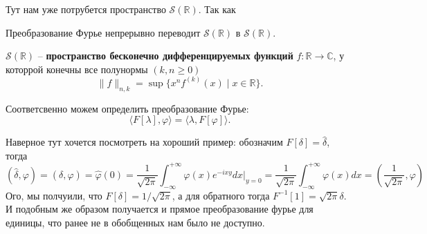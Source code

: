 Тут нам уже потрубется пространство $\mathcal{S}(\mathbb{R})$. Так как
\begin{to_def}
	Преобразование Фурье непрерывно переводит $\mathcal{S}(\mathbb{R})$ в $\mathcal{S}(\mathbb{R})$.
\end{to_def}

\begin{to_def}
	$\mathcal{S}(\mathbb{R})$ -- \textbf{пространство бесконечно дифференцируемых функций} $f \colon \mathbb{R} \to \mathbb{C}$, у которрой конечны все полунормы $(k,n \geq 0)$
	\begin{equation*}
		\|f\|_{n,k} = \sup \{x^n f^{(k)}(x) \mid x \in \mathbb{R}\}.
	\end{equation*}
\end{to_def}

Соответсвенно можем определить преобразование Фурье:
\begin{equation*}
	\langle F[\lambda], \varphi\rangle = \langle \lambda, F[\varphi]\rangle.
\end{equation*}

Наверное тут хочется посмотреть на хороший пример: обозначим $F[\delta] = \hat{\delta}$, тогда
\begin{equation*}
	(\hat{\delta}, \varphi) = (\delta, \hat{\varphi}) = \hat{\varphi}(0) = \frac{1}{\sqrt{2 \pi}} \int_{-\infty}^{+\infty} \varphi(x) e^{- i x y} d x\big|_{y=0} = \frac{1}{\sqrt{2 \pi}} \int_{-\infty}^{+\infty} \varphi(x) d x = \left(\frac{1}{\sqrt{2 \pi}}, \varphi\right)
\end{equation*}
Ого, мы полчуили, что $F[\delta] = 1/\sqrt{2\pi}$, а для обратного тогда $F^{-1}[1] = \sqrt{2\pi}\delta$. И подобным же образом получается и прямое преобразование фурье для единицы, что ранее не в обобщенных нам было не доступно.
